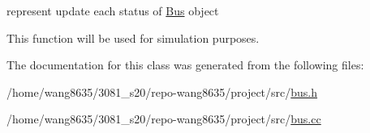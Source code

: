 represent update each status of \hyperlink{classBus}{Bus} object 

This function will be used for simulation purposes. 

The documentation for this class was generated from the following files\+:\begin{DoxyCompactItemize}
\item 
/home/wang8635/3081\+\_\+s20/repo-\/wang8635/project/src/\hyperlink{bus_8h}{bus.\+h}\item 
/home/wang8635/3081\+\_\+s20/repo-\/wang8635/project/src/\hyperlink{bus_8cc}{bus.\+cc}\end{DoxyCompactItemize}

